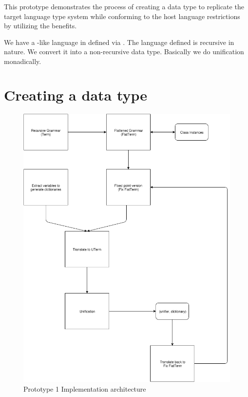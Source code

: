 \documentclass[thesis-solanki.tex]{subfiles}
\begin{document}
This prototype demonstrates the process of creating a data type to replicate the target language type system while conforming to the host 
language restrictions by utilizing the
benefits.



We have a -like language in  defined via . The language defined is recursive in nature. We convert 
it into a non-recursive data type. Basically we do unification monadically.

\section{Creating a data type}
\begin{figure}
  \includegraphics[width=1\textwidth]{prototype_1_implementation_architecture.png}
  \caption{Prototype 1 Implementation architecture}
  \label{fig:proto1-impl-arch}
\end{figure}
\end{document}
